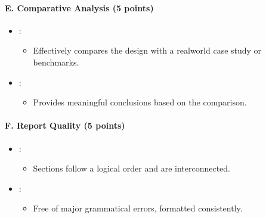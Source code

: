 \documentclass[letterpaper,10pt,english]{jupyterBook}
\begin{document}
\paragraph{E. Comparative Analysis (5 points)}
\label{\detokenize{ProjectInstructions:e-comparative-analysis-5-points}}\begin{itemize}
\item {} 
\sphinxAtStartPar
{}:
\begin{itemize}
\item {} 
\sphinxAtStartPar
Effectively compares the design with a real\sphinxhyphen{}world case study or
benchmarks.

\end{itemize}

\item {} 
\sphinxAtStartPar
{}:
\begin{itemize}
\item {} 
\sphinxAtStartPar
Provides meaningful conclusions based on the comparison.

\end{itemize}

\end{itemize}


\paragraph{F. Report Quality (5 points)}
\label{\detokenize{ProjectInstructions:f-report-quality-5-points}}\begin{itemize}
\item {} 
\sphinxAtStartPar
{}:
\begin{itemize}
\item {} 
\sphinxAtStartPar
Sections follow a logical order and are interconnected.

\end{itemize}

\item {} 
\sphinxAtStartPar
{}:
\begin{itemize}
\item {} 
\sphinxAtStartPar
Free of major grammatical errors, formatted consistently.

\end{itemize}

\end{itemize}
\end{document}

